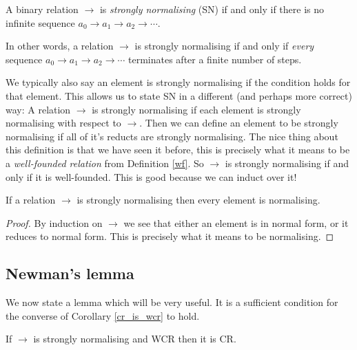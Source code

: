 \begin{defin}
    A binary relation $\to$ is \emph{strongly normalising} (SN) if and only if there is no infinite sequence $a_0 \to a_1 \to a_2 \to  \cdots$.
\end{defin}

\begin{remark}
    In other words, a relation $\to$ is strongly normalising if and only if \emph{every} sequence $a_0 \to a_1 \to a_2 \to  \cdots$ terminates after a finite number of steps.
\end{remark}

\begin{remark}
    We typically also say an element is strongly normalising if the condition holds for that element. This allows us to state SN in a different (and perhaps more correct) way: A relation $\to$ is strongly normalising if each element is strongly normalising with respect to $\to$. Then we can define an element to be strongly normalising if all of it's reducts are strongly normalising. The nice thing about this definition is that we have seen it before, this is precisely what it means to be a \emph{well-founded relation} from Definition \ref{wf}. So $\to$ is strongly normalising if and only if it is well-founded. This is good because we can induct over it!
\end{remark}

\begin{cor}
    If a relation $\to$ is strongly normalising then every element is normalising.
\end{cor}

\begin{proof}
    By induction on $\to$ we see that either an element is in normal form, or it reduces to normal form. This is precisely what it means to be normalising.
\end{proof}

\subsection{Newman's lemma}

We now state a lemma which will be very useful. It is a sufficient condition for the converse of Corollary \ref{cr_is_wcr} to hold.

\begin{lemma}\label{newman}
    If $\to$ is strongly normalising and WCR then it is CR.
\end{lemma}

